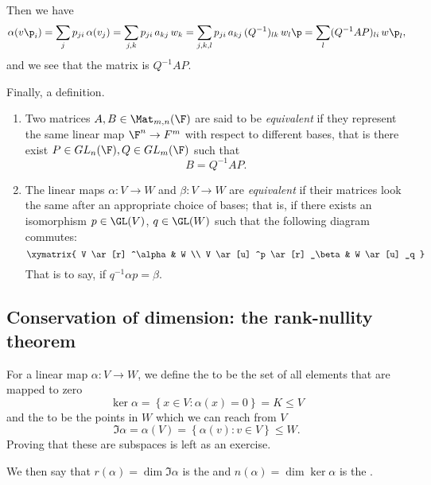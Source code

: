 Then we have
\begin{equation*}
	\alpha(v\p_i)
	= \sum_j p_{ji}\,\alpha(v_j)
	= \sum_{j,k} p_{ji} \, a_{kj} \, w_k
	= \sum_{j,k,l} p_{ji}\,a_{kj} \, (Q^{-1})_{lk} \, w_l\p %
	= \sum_l (Q^{-1}AP)_{li} \,w\p_l,
\end{equation*}
and we see that the matrix is $Q^{-1}AP$.

Finally, a definition.

\begin{definition}
	\mbox{}
	\begin{enumerate}
		\shortskip
		\item Two matrices $A, B \in \Mat_{m,n}(\F)$ are said to be \emph{equivalent} if they represent the same linear map $\F^n \to F^m$ with respect to different bases, that is there exist $P \in GL_n(\F), Q\in GL_m(\F)$ such that
		\begin{equation*}
			B = Q^{-1}AP.
		\end{equation*}
		\item The linear maps $\alpha:V\to W$ and $\beta:V\to W$ are \emph{equivalent} if their matrices look the same after an appropriate choice of bases; that is, if there exists an isomorphism $p\in\GL(V)$, $q\in\GL(W)$ such that the following diagram commutes: %
		\begin{equation*}
			\xymatrix{
				V
					\ar [r] ^\alpha
				&
				W \\
				V
					\ar [u] ^p
					\ar [r] _\beta
				&
				W
					\ar [u] _q
			}
		\end{equation*}
		That is to say, if $q^{-1}\alpha p=\beta$.
	\end{enumerate}
\end{definition}


	\pagebreak

\subsection{Conservation of dimension: the rank-nullity theorem} %
\label{sub:rank_nullity_theorem}

\begin{definition}
	For a linear map $\alpha:V\to W$, we define the  to be the set of all elements that are mapped to zero %
	\begin{equation*}
		\ker \alpha = \left\{x\in V:\alpha(x) = 0\right\} = K \leq V
	\end{equation*}
	and the  to be the points in $W$ which we can reach from $V$ %
	\begin{equation*}
		\Im \alpha = \alpha(V) = \left\{\alpha(v) : v\in V\right\} \leq W.
	\end{equation*}
	Proving that these are subspaces is left as an exercise.
	
	We then say that $r(\alpha)=\dim \Im \alpha$ is the  and $n(\alpha)=\dim\ker\alpha$ is the . %
\end{definition}

